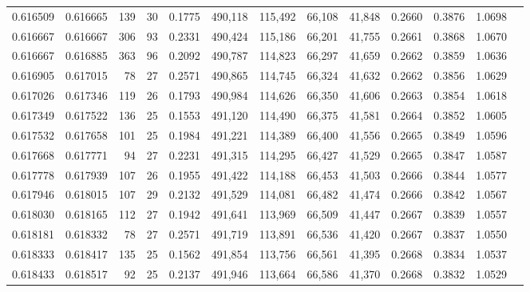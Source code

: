 \begin{tabular}{rrrrrrrrrrrrr}
0.616509 & 0.616665 &    139 &    30 &                                     0.1775 & 490,118 & 115,492 &  66,108 &  41,848 & 0.2660 & 0.3876 & 1.0698 \\
0.616667 & 0.616667 &    306 &    93 &                                     0.2331 & 490,424 & 115,186 &  66,201 &  41,755 & 0.2661 & 0.3868 & 1.0670 \\
0.616667 & 0.616885 &    363 &    96 &                                     0.2092 & 490,787 & 114,823 &  66,297 &  41,659 & 0.2662 & 0.3859 & 1.0636 \\
0.616905 & 0.617015 &     78 &    27 &                                     0.2571 & 490,865 & 114,745 &  66,324 &  41,632 & 0.2662 & 0.3856 & 1.0629 \\
0.617026 & 0.617346 &    119 &    26 &                                     0.1793 & 490,984 & 114,626 &  66,350 &  41,606 & 0.2663 & 0.3854 & 1.0618 \\
0.617349 & 0.617522 &    136 &    25 &                                     0.1553 & 491,120 & 114,490 &  66,375 &  41,581 & 0.2664 & 0.3852 & 1.0605 \\
0.617532 & 0.617658 &    101 &    25 &                                     0.1984 & 491,221 & 114,389 &  66,400 &  41,556 & 0.2665 & 0.3849 & 1.0596 \\
0.617668 & 0.617771 &     94 &    27 &                                     0.2231 & 491,315 & 114,295 &  66,427 &  41,529 & 0.2665 & 0.3847 & 1.0587 \\
0.617778 & 0.617939 &    107 &    26 &                                     0.1955 & 491,422 & 114,188 &  66,453 &  41,503 & 0.2666 & 0.3844 & 1.0577 \\
0.617946 & 0.618015 &    107 &    29 &                                     0.2132 & 491,529 & 114,081 &  66,482 &  41,474 & 0.2666 & 0.3842 & 1.0567 \\
0.618030 & 0.618165 &    112 &    27 &                                     0.1942 & 491,641 & 113,969 &  66,509 &  41,447 & 0.2667 & 0.3839 & 1.0557 \\
0.618181 & 0.618332 &     78 &    27 &                                     0.2571 & 491,719 & 113,891 &  66,536 &  41,420 & 0.2667 & 0.3837 & 1.0550 \\
0.618333 & 0.618417 &    135 &    25 &                                     0.1562 & 491,854 & 113,756 &  66,561 &  41,395 & 0.2668 & 0.3834 & 1.0537 \\
0.618433 & 0.618517 &     92 &    25 &                                     0.2137 & 491,946 & 113,664 &  66,586 &  41,370 & 0.2668 & 0.3832 & 1.0529 \\

\end{tabular}
